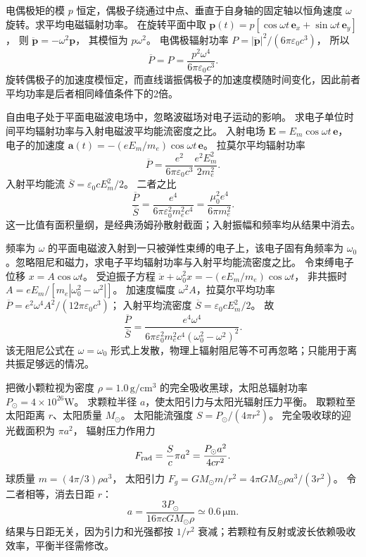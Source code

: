 电偶极矩的模 $p$ 恒定，偶极子绕通过中点、垂直于自身轴的固定轴以恒角速度 $\omega$ 旋转。求平均电磁辐射功率。
\exsolution
在旋转平面中取
$\bm p(t)=p[\cos\omega t\,\bm e_x+
\sin\omega t\,\bm e_y]$，
则
$\ddot{\bm p}=-\omega^2\bm p$，
其模恒为 $p\omega^2$。
电偶极辐射功率
$P=|\ddot{\bm p}|^2/(6\pi\varepsilon_0c^3)$，
所以
\[
\boxed{\overline P=P=
\frac{p^2\omega^4}{6\pi\varepsilon_0c^3}}.
\]
\excheck 旋转偶极子的加速度模恒定，而直线谐振偶极子的加速度模随时间变化，因此前者平均功率是后者相同峰值条件下的2倍。

自由电子处于平面电磁波电场中，忽略波磁场对电子运动的影响。
求电子单位时间平均辐射功率与入射电磁波平均能流密度之比。
\exsolution
入射电场
$\bm E=E_m\cos\omega t\,\bm e$，
电子的加速度
$\bm a(t)=-(eE_m/m_e)\cos\omega t\,\bm e$。
拉莫尔平均辐射功率
\[
\overline P=
\frac{e^2}{6\pi\varepsilon_0c^3}
\frac{e^2E_m^2}{2m_e^2}.
\]
入射平均能流
$\overline S=\varepsilon_0cE_m^2/2$。
二者之比
\[
\boxed{\frac{\overline P}{\overline S}
=\frac{e^4}{6\pi\varepsilon_0^2m_e^2c^4}
=\frac{\mu_0^2e^4}{6\pi m_e^2}}.
\]
\excheck 这一比值有面积量纲，是经典汤姆孙散射截面；入射振幅和频率均从结果中消去。

频率为 $\omega$ 的平面电磁波入射到一只被弹性束缚的电子上，该电子固有角频率为 $\omega_0$。忽略阻尼和磁力，求电子平均辐射功率与入射平均能流密度之比。
\exsolution
令束缚电子位移
$x=A\cos\omega t$。
受迫振子方程
$\ddot x+\omega_0^2x=-(eE_m/m_e)\cos\omega t$，
非共振时
$A=eE_m/[m_e|\omega_0^2-\omega^2|]$。
加速度幅度
$\omega^2A$，拉莫尔平均功率
$\overline P=e^2\omega^4A^2/(12\pi\varepsilon_0c^3)$；
入射平均流密度
$\overline S=\varepsilon_0cE_m^2/2$。
故
\[
\boxed{\frac{\overline P}{\overline S}
=\frac{e^4\omega^4}
{6\pi\varepsilon_0^2m_e^2c^4(\omega_0^2-\omega^2)^2}}.
\]
\excheck 该无阻尼公式在 $\omega=\omega_0$ 形式上发散，物理上辐射阻尼等不可再忽略；只能用于离共振足够远的情况。

把微小颗粒视为密度 $\rho=1.0\,\mathrm{g/cm^3}$ 的完全吸收黑球，太阳总辐射功率
$P_\odot=4\times10^{26}$W。
求颗粒半径 $a$，使太阳引力与太阳光辐射压力平衡。
\exsolution
取颗粒至太阳距离 $r$、太阳质量 $M_\odot$。
太阳能流强度
$S=P_\odot/(4\pi r^2)$。
完全吸收球的迎光截面积为 $\pi a^2$，
辐射压力作用力
\[
F_{\rm rad}=\frac Sc\pi a^2
=\frac{P_\odot a^2}{4cr^2}.
\]
球质量
$m=(4\pi/3)\rho a^3$，
太阳引力
$F_g=GM_\odot m/r^2
=4\pi GM_\odot\rho a^3/(3r^2)$。
令二者相等，消去日距 $r$：
\[
\boxed{a=\frac{3P_\odot}
{16\pi cG M_\odot\rho}
\simeq0.6\,\mathrm{\mu m}}.
\]
\excheck 结果与日距无关，因为引力和光强都按 $1/r^2$ 衰减；若颗粒有反射或波长依赖吸收效率，平衡半径需修改。
